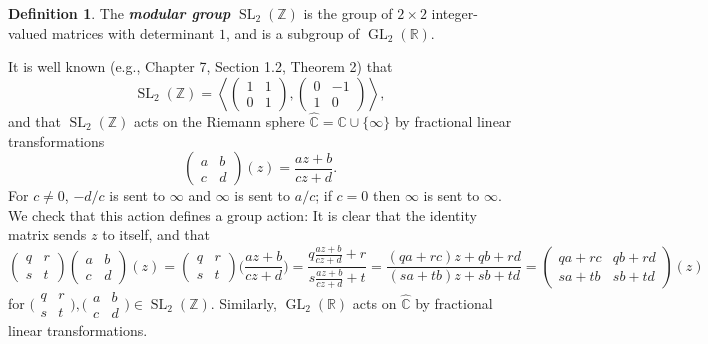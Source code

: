 \documentclass[10pt,leqno,twoside]{article}
\theoremstyle{plain}
\theoremstyle{definition}
\newtheorem{definition/}[lem]{Definition}
\newenvironment{definition}
  {\renewcommand{\qedsymbol}{\textdagger}%
   \pushQED{\qed}\begin{definition/}}
  {\popQED\end{definition/}}
\numberwithin{equation}{section}
\numberwithin{lem}{section}
\newcommand{\textib}[1]{\textbf{\textit{#1\index{#1}}}} %
\DeclareMathOperator{\GL}{GL}
\DeclareMathOperator{\SL}{SL}
\newcommand{\abcd}{\begin{pmatrix}
    a & b \\ c & d
\end{pmatrix}}
\newcommand{\slz}{\SL_2(\mathbb{Z})}
\newcommand{\glr}{\GL_2(\mathbb{R})}
\begin{document}
\begin{definition}
    The \textib{modular group} $\slz$ is the group of $2\times 2$ integer-valued matrices with determinant $1$, and is a subgroup of $\glr$.
\end{definition} 
It is well known (e.g., \cite{serre} Chapter 7, Section 1.2, Theorem 2) that 
\begin{equation}\label{eqn: generators modular group}
    \slz = \left\langle\begin{pmatrix}
        1 & 1 \\ 0 & 1
    \end{pmatrix}, \begin{pmatrix}
        0 & -1 \\ 1 & 0
    \end{pmatrix}\right\rangle, 
\end{equation}
and that $\slz$ acts on the Riemann sphere $\widehat{\mathbb{C}} = \mathbb{C}\cup \{\infty\}$ by fractional linear transformations
\[\abcd(z) = \frac{az + b}{cz + d}.\] For $c\neq 0$, $-d/c$ is sent to $\infty$ and $\infty$ is sent to $a/c$; if $c = 0$ then $\infty$ is sent to $\infty$. We check that this action defines a group action: It is clear that the identity matrix sends $z$ to itself, and that 
\[\begin{pmatrix}
    q & r \\ s & t
\end{pmatrix}\abcd(z) = \begin{pmatrix}
    q & r \\ s & t
\end{pmatrix}\Big(\frac{az+b}{cz+d}\Big) = \frac{q\frac{az+b}{cz+d}+r}{s\frac{az+b}{cz+d}+t} = \frac{(qa+rc)z+qb+rd}{(sa+tb)z+sb+td} = \begin{pmatrix}
    qa+rc & qb+rd \\ sa+tb & sb+td
\end{pmatrix}(z)\] for $\big(\!\begin{smallmatrix}
    q & r \\ s & t
\end{smallmatrix}\!\big),\big(\!\begin{smallmatrix}
    a & b \\ c & d
\end{smallmatrix}\!\big)\in \slz$. Similarly, $\glr$ acts on $\widehat{\mathbb C}$ by fractional linear transformations.
\end{document}

